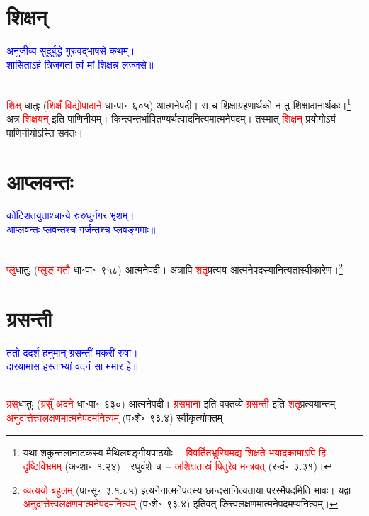 \section[शिक्षन्]{शिक्षन्}
\centering\textcolor{blue}{अनुजीव्य सुदुर्बुद्धे गुरुवद्भाषसे कथम्।\nopagebreak\\
शासिताऽहं त्रिजगतां त्वं मां शिक्षन्न लज्जसे॥}\nopagebreak\\
\\
\begin{sloppypar}\justifying\noindent\hspace{10mm} \textcolor{red}{शिक्ष्} धातुः (\textcolor{red}{शिक्षँ विद्योपादाने} धा॰पा॰~६०५) आत्मनेपदी। स च शिक्षा\-ग्रहणार्थको न तु शिक्षा\-दानार्थकः।\footnote{यथा शकुन्तला\-नाटकस्य मैथिलबङ्गीयपाठयोः~– \textcolor{red}{विवर्तित\-भ्रूरियमद्य शिक्षते भयादकामाऽपि हि दृष्टि\-विभ्रमम्} (अ॰शा॰~१.२४)। रघुवंशे च~– \textcolor{red}{अशिक्षतास्रं पितुरेव मन्त्रवत्} (र॰वं॰~३.३१)।} अत्र \textcolor{red}{शिक्षयन्} इति पाणिनीयम्। किन्त्वन्तर्भावित\-ण्यर्थत्वादनित्यमात्मनेपदम्। तस्मात् \textcolor{red}{शिक्षन्} प्रयोगोऽयं पाणिनीयोऽस्ति सर्वतः।\end{sloppypar}
\section[आप्लवन्तः]{आप्लवन्तः}
\centering\textcolor{blue}{कोटिशतयुताश्चान्ये रुरुधुर्नगरं भृशम्।\nopagebreak\\
आप्लवन्तः प्लवन्तश्च गर्जन्तश्च प्लवङ्गमाः॥}\nopagebreak\\
\\
\begin{sloppypar}\justifying\noindent\hspace{10mm} \textcolor{red}{प्लु}\-धातुः (\textcolor{red}{प्लुङ् गतौ} धा॰पा॰~९५८) आत्मनेपदी। अत्रापि \textcolor{red}{शतृ}\-प्रत्यय आत्मनेपदस्यानित्यता\-स्वीकारेण।\footnote{\textcolor{red}{व्यत्ययो बहुलम्} (पा॰सू॰~३.१.८५) इत्यनेनात्मनेपदस्य छान्दसानित्यताया परस्मैपदमिति भावः। यद्वा \textcolor{red}{अनुदात्तेत्त्व\-लक्षणमात्मने\-पदमनित्यम्} (प॰शे॰~९३.४) इतिवत् ङित्त्व\-लक्षणमात्मने\-पदमप्यनित्यम्।}\end{sloppypar}
\section[ग्रसन्ती]{ग्रसन्ती}
\centering\textcolor{blue}{ततो ददर्श हनुमान् ग्रसन्तीं मकरीं रुषा।\nopagebreak\\
दारयामास हस्ताभ्यां वदनं सा ममार हे॥}\nopagebreak\\
\\
\begin{sloppypar}\justifying\noindent\hspace{10mm} \textcolor{red}{ग्रस्‌}\-धातुः (\textcolor{red}{ग्रसुँ अदने} धा॰पा॰~६३०) आत्मनेपदी। \textcolor{red}{ग्रसमाना} इति वक्तव्ये \textcolor{red}{ग्रसन्ती} इति \textcolor{red}{शतृ}\-प्रत्ययान्तम् \textcolor{red}{अनुदात्तेत्त्व\-लक्षणमात्मने\-पदमनित्यम्} (प॰शे॰~९३.४) स्वीकृत्योक्तम्।\end{sloppypar}
